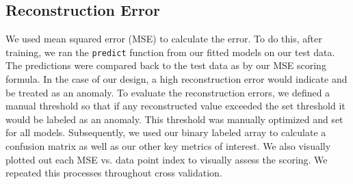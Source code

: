 \documentclass[sigconf]{acmart}
\begin{document}
\subsection{Reconstruction Error}
We used mean squared error (MSE) to calculate the error.
To do this, after training, we ran the \texttt{predict} function from our fitted models on our test data. The predictions were compared back to the test data as by our MSE scoring formula. In the case of our design, a high reconstruction error would indicate and be treated as an anomaly.  %
To evaluate the reconstruction errors, we defined a manual threshold so that if any reconstructed value exceeded the set threshold it would be labeled as an anomaly. This threshold was manually optimized and set for all models.  Subsequently, we used our binary labeled array to calculate a confusion matrix as well as our other key metrics of interest. We also visually plotted out each MSE vs. data point index to visually assess the scoring. We repeated this processes throughout cross validation. 

\end{document}
